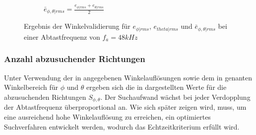 \begin{figure}
\begin{subfigure}[b]{0.48\textwidth}
                \caption{$\bar e_{\phi, \theta | rms} = \frac{e_{\phi | rms} + e_{\theta | rms}}{2}$}
                \label{fig:angle_error_mid}
        \end{subfigure}
        \caption{Ergebnis der Winkelvalidierung für $e_{\phi | rms}$, $e_{theta | rms}$ und $\bar e_{\phi, \theta | rms}$ bei einer Abtastfrequenz von $f_a = 48 kHz$}
        \label{fig:angle_error}
\end{figure}








\subsubsection{Anzahl abzusuchender Richtungen}

Unter Verwendung der in  angegebenen Winkelauflösungen sowie dem in  genanten Winkelbereich für $\phi$ und $\theta$ ergeben sich die in  dargestellten Werte für die abzusuchenden Richtungen $S_{\phi,\theta}$. Der Suchaufwand wächst bei jeder Verdopplung der Abtastfrequenz überproportional an. Wie sich später zeigen wird, muss, um eine ausreichend hohe Winkelauflösung zu erreichen, ein optimiertes Suchverfahren entwickelt werden, wodurch das Echtzeitkriterium erfüllt wird. 



